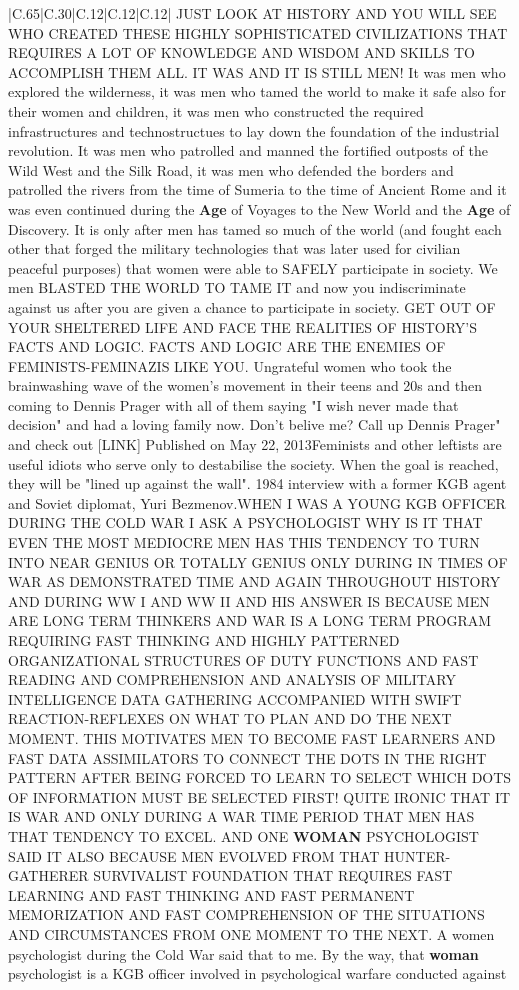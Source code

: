 \documentclass[11pt]{article}
\newlength\mylength
\begin{document}
\begin{center}
\begin{longtable}{|C{.65\mylength}|C{.30\mylength}|C{.12\mylength}|C{.12\mylength}|C{.12\mylength}|}
  \small JUST LOOK AT HISTORY AND YOU WILL SEE WHO CREATED THESE HIGHLY SOPHISTICATED CIVILIZATIONS THAT REQUIRES A LOT OF KNOWLEDGE AND WISDOM AND SKILLS TO ACCOMPLISH THEM ALL. IT WAS AND IT IS STILL MEN!  It was men who explored the wilderness, it was men who tamed the world to make it safe also for their women and children, it was men who constructed the required infrastructures and technostructues to lay down the foundation of the industrial revolution. It was men who patrolled and manned the fortified outposts of the Wild West and the Silk Road, it was men who defended the borders and patrolled the rivers from the time of Sumeria to the time of Ancient Rome and it was even continued during the \textbf{Age} of Voyages to the New World and the \textbf{Age} of Discovery. It is only after men has tamed so much of the world (and fought each other that forged the military technologies that was later used for civilian peaceful purposes) that women were able to SAFELY participate in society. We men BLASTED THE WORLD TO TAME IT and now you indiscriminate against us after you are given a chance to participate in society. GET OUT OF YOUR SHELTERED LIFE AND FACE THE REALITIES OF HISTORY'S FACTS AND LOGIC. FACTS AND LOGIC ARE THE ENEMIES OF FEMINISTS-FEMINAZIS LIKE YOU. Ungrateful women who took the brainwashing wave of the women's movement in their teens and 20s and then coming to Dennis Prager with all of them saying "I wish never made that decision" and had a loving family now. Don't belive me? Call up Dennis Prager" and check out  [LINK]   Published on May 22, 2013Feminists and other leftists are useful idiots who serve only to destabilise the society. When the goal is reached, they will be "lined up against the wall". 1984 interview with a former KGB agent and Soviet diplomat, Yuri Bezmenov.WHEN I WAS A YOUNG KGB OFFICER DURING THE COLD WAR I ASK A PSYCHOLOGIST WHY IS IT THAT EVEN THE MOST MEDIOCRE MEN HAS THIS TENDENCY TO TURN INTO NEAR GENIUS OR TOTALLY GENIUS ONLY DURING IN TIMES OF WAR AS DEMONSTRATED TIME AND AGAIN THROUGHOUT HISTORY AND DURING WW I AND WW II AND HIS ANSWER IS BECAUSE MEN ARE LONG TERM THINKERS AND WAR IS A LONG TERM PROGRAM REQUIRING FAST THINKING AND HIGHLY PATTERNED ORGANIZATIONAL STRUCTURES OF DUTY FUNCTIONS AND FAST READING AND COMPREHENSION AND ANALYSIS OF MILITARY INTELLIGENCE DATA GATHERING ACCOMPANIED WITH SWIFT REACTION-REFLEXES ON WHAT TO PLAN AND DO THE NEXT MOMENT. THIS MOTIVATES MEN TO BECOME FAST LEARNERS AND FAST DATA ASSIMILATORS TO CONNECT THE DOTS IN THE RIGHT PATTERN AFTER BEING FORCED TO LEARN TO SELECT WHICH DOTS OF INFORMATION MUST BE SELECTED FIRST! QUITE IRONIC THAT IT IS WAR AND ONLY DURING A WAR TIME PERIOD THAT MEN HAS THAT TENDENCY TO EXCEL. AND ONE \textbf{WOMAN} PSYCHOLOGIST SAID IT ALSO BECAUSE MEN EVOLVED FROM THAT HUNTER-GATHERER SURVIVALIST FOUNDATION THAT REQUIRES FAST LEARNING AND FAST THINKING AND FAST PERMANENT MEMORIZATION AND FAST COMPREHENSION OF THE SITUATIONS AND CIRCUMSTANCES FROM ONE MOMENT TO THE NEXT. A women psychologist during the Cold War said that to me. By the way, that \textbf{woman} psychologist is a KGB officer involved in psychological warfare conducted against 
\end{longtable}
\end{center}
\end{document}
